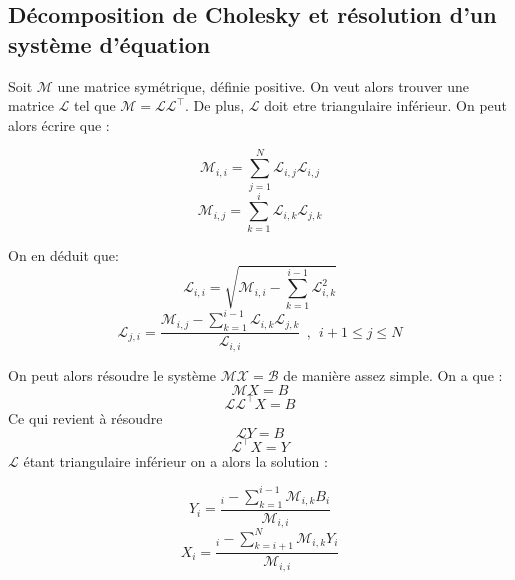 \documentclass[a4paper,french,10pt]{article}
\begin{document}
\subsection{Décomposition de Cholesky et résolution d'un système d'équation}

Soit $\mathcal{M}$ une matrice symétrique, définie positive. On veut alors trouver une matrice $\mathcal{L}$ tel que $\mathcal{M} = \mathcal{L}\mathcal{L}^\intercal$. De plus, $\mathcal{L}$ doit etre triangulaire inférieur. 
On peut alors écrire que :

\begin{equation*}
	\mathcal{M}_{i,i} = \sum_{j=1}^N \mathcal{L}_{i,j}\mathcal{L}_{i,j}
\end{equation*}
\begin{equation*}
    \mathcal{M}_{i,j} = \sum_{k=1}^i \mathcal{L}_{i,k}\mathcal{L}_{j,k}    
\end{equation*}

On en déduit que:
\begin{equation*}
	\mathcal{L}_{i,i} = \sqrt{\mathcal{M}_{i,i} - \sum_{k=1}^{i-1}\mathcal{L}_{i,k}^2}
\end{equation*}
\begin{equation*}
	\mathcal{L}_{j,i} = \frac{\mathcal{M}_{i,j} - \sum_{k=1}^{i-1}\mathcal{L}_{i,k}\mathcal{L}_{j,k}}{\mathcal{L}_{i,i}}~~,~~i+1 \leqslant j \leqslant N
\end{equation*}

\newpage On peut alors résoudre le système $\mathcal{M}\mathcal{X} = \mathcal{B}$ de manière assez simple.
On a que :
\begin{equation*}
	\mathcal{M} X = B
\end{equation*}
\begin{equation*}
	\mathcal{L}\mathcal{L}^\intercal X = B
\end{equation*}
Ce qui revient à résoudre
\begin{equation*}
	\mathcal{L}Y = B
\end{equation*}
\begin{equation*}
	\mathcal{L}^\intercal X = Y
\end{equation*}
$\mathcal{L}$ étant triangulaire inférieur on a alors la solution :

\begin{equation*}
	Y_i = \frac{_i - \sum_{k = 1}^{i - 1}\mathcal{M}_{i,k}B_i}{\mathcal{M}_{i,i}}
\end{equation*}
\begin{equation*}
	X_i = \frac{_i - \sum_{k = i + 1}^{N}\mathcal{M}_{i,k}Y_i}{\mathcal{M}_{i,i}}
\end{equation*}
\end{document}
